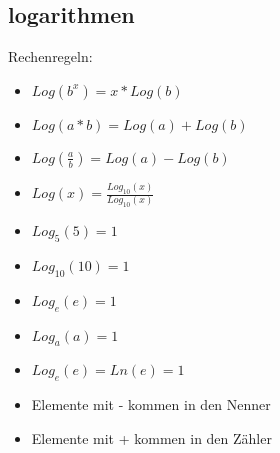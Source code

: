 \newpage
\subsection{logarithmen}

Rechenregeln:
\begin{itemize}
    \item $Log(b^x) = x*Log(b)$
    \item $Log(a*b) = Log(a)+Log(b)$
    \item $Log(\frac{a}{b}) = Log(a)-Log(b)$
    \item $Log(x) = \frac{Log_{10}(x)}{Log_{10}(x)}$
    \item $Log_5(5) = 1$
    \item $Log_{10}(10) = 1$
    \item $Log_e(e) = 1$
    \item $Log_a(a) = 1$
    \item $Log_e(e) = Ln(e)= 1$
    \item Elemente mit - kommen in den Nenner
    \item Elemente mit + kommen in den Zähler
\end{itemize}